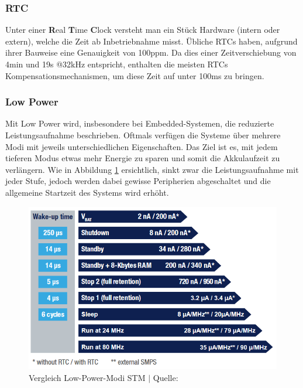 \documentclass[12pt]{article}
\begin{document}
	\subsubsection*{RTC}
	Unter einer \textbf{R}eal \textbf{T}ime \textbf{C}lock versteht man ein Stück Hardware (intern oder extern), welche die Zeit ab Inbetriebnahme misst. Übliche RTCs haben, aufgrund ihrer Bauweise eine Genauigkeit von 100ppm. Da dies einer Zeitverschiebung von 4min und 19s @32kHz entspricht, enthalten die meisten RTCs Kompensationsmechanismen, um diese Zeit auf unter 100ms zu bringen. \cite{dighe_tps65950_2008}
	\subsubsection*{Low Power}
	Mit Low Power wird, insbesondere bei Embedded-Systemen, die reduzierte Leistungsaufnahme beschrieben. Oftmals verfügen die Systeme über mehrere Modi mit jeweils unterschiedlichen Eigenschaften. Das Ziel ist es, mit jedem tieferen Modus etwas mehr Energie zu sparen und somit die Akkulaufzeit zu verlängern. Wie in Abbildung  \ref{fig:batlow-power-modestm} ersichtlich, sinkt zwar die Leistungsaufnahme mit jeder Stufe, jedoch werden dabei gewisse Peripherien abgeschaltet und die allgemeine Startzeit des Systems wird erhöht.
	\begin{figure}[H]
		\centering
		\includegraphics[width=0.7\linewidth]{images/BAT_Low-Power-Mode_STM}
		\caption{Vergleich Low-Power-Modi STM $\vert$ Quelle: \cite{noauthor_stm32l4_2024}}
		\label{fig:batlow-power-modestm}
	\end{figure}
	
\end{document}

